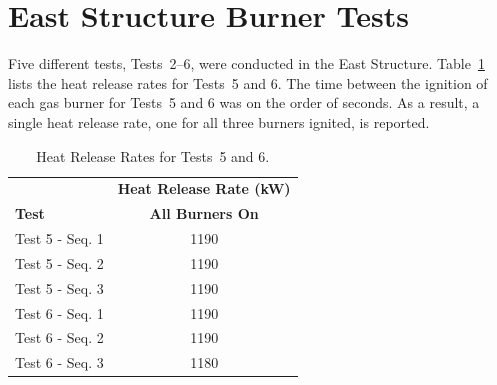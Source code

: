 \section{East Structure Burner Tests}
Five different tests, Tests~2--6, were conducted in the East Structure. Table~\ref{table:HRR_Tests_5-6} lists the heat release rates for Tests~5 and 6. The time between the ignition of each gas burner for Tests~5 and 6 was on the order of seconds. As a result, a single heat release rate, one for all three burners ignited, is reported.

\renewcommand{\baselinestretch}{1}

\begin{table}[!ht]
\caption[Heat Release Rates for Tests~5 and 6.]{Heat Release Rates for Tests~5 and 6.}
\begin{center}
\begin{tabular}{lc}
 \toprule
 & \textbf{Heat Release Rate (kW)} \\
\textbf{Test} & \textbf{All Burners On} \\
\midrule
Test 5 - Seq. 1		& 1190 \\
Test 5 - Seq. 2		& 1190 \\
Test 5 - Seq. 3		& 1190 \\
Test 6 - Seq. 1		& 1190 \\
Test 6 - Seq. 2		& 1190 \\
Test 6 - Seq. 3		& 1180 \\
\bottomrule
\end{tabular}
\end{center}
\label{table:HRR_Tests_5-6}
\end{table}
\FloatBarrier

